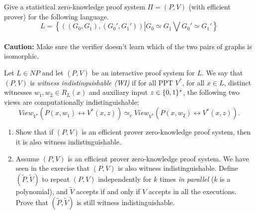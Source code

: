 \begin{exercise} Give a statistical zero-knowledge proof system $\Pi = (P,V)$ (with efficient prover) for the following language.
    \[ L = \left\{((G_0,G_1),(G_0',G_1'))\left| G_0 \simeq G_1 \bigvee G_0' \simeq G_1'\right.\right\}\]\\
    \textbf{Caution:} Make sure the verifier doesn't learn which of the two pairs of graphs is isomorphic.
\end{exercise}

\begin{exercise} [ZK implies WI] Let $L \in NP$ and let $(P,V)$ be an interactive proof system for $L$. We say that $(P,V)$ is \emph{witness indistinguishable (WI)} if for all PPT $V^*$, for all $x \in L$, distinct witnesses $w_1, w_2 \in R_L(x)$ and  auxiliary input $z\in \{ 0, 1 \}^{*}$, the following two views are computationally indistinguishable:
\[View_{V^*} \left(P(x,w_1) \leftrightarrow V^*(x,z) \right) \simeq_c View_{V^*} \left(P(x,w_2) \leftrightarrow V^*(x,z) \right).\]
\begin{enumerate}
\item Show that if $(P,V)$ is an efficient prover zero-knowledge proof system, then it is also witness indistinguishable.

\item Assume $(P,V)$ is an efficient prover zero-knowledge proof system. We have seen in the exercise that $(P,V)$ is also witness indistinguishable. Define $(\tilde P, \tilde V)$ to repeat $(P,V)$ independently for $k$ times \emph{in parallel} ($k$ is a polynomial), and $\tilde V$ accepts if and only if $V$ accepts in all the executions. Prove that $(\tilde P, \tilde V)$ is still witness indistinguishable.
\end{enumerate}    
\end{exercise}












